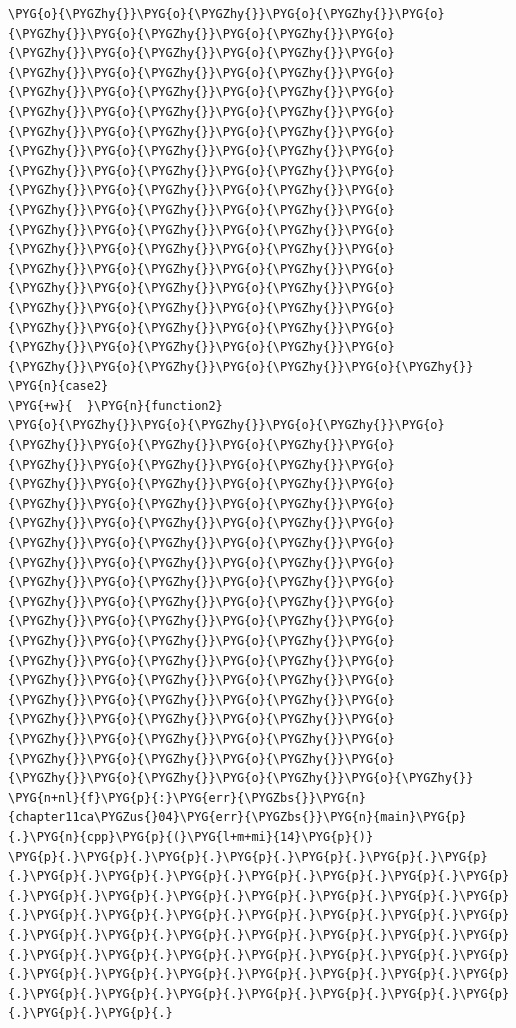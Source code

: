 \begin{codeblockbg}
\begin{Verbatim}[commandchars=\\\{\},breaklines=true,breakanywhere=true,fontsize=\codefont,xleftmargin=17bp]
\PYG{o}{\PYGZhy{}}\PYG{o}{\PYGZhy{}}\PYG{o}{\PYGZhy{}}\PYG{o}{\PYGZhy{}}\PYG{o}{\PYGZhy{}}\PYG{o}{\PYGZhy{}}\PYG{o}{\PYGZhy{}}\PYG{o}{\PYGZhy{}}\PYG{o}{\PYGZhy{}}\PYG{o}{\PYGZhy{}}\PYG{o}{\PYGZhy{}}\PYG{o}{\PYGZhy{}}\PYG{o}{\PYGZhy{}}\PYG{o}{\PYGZhy{}}\PYG{o}{\PYGZhy{}}\PYG{o}{\PYGZhy{}}\PYG{o}{\PYGZhy{}}\PYG{o}{\PYGZhy{}}\PYG{o}{\PYGZhy{}}\PYG{o}{\PYGZhy{}}\PYG{o}{\PYGZhy{}}\PYG{o}{\PYGZhy{}}\PYG{o}{\PYGZhy{}}\PYG{o}{\PYGZhy{}}\PYG{o}{\PYGZhy{}}\PYG{o}{\PYGZhy{}}\PYG{o}{\PYGZhy{}}\PYG{o}{\PYGZhy{}}\PYG{o}{\PYGZhy{}}\PYG{o}{\PYGZhy{}}\PYG{o}{\PYGZhy{}}\PYG{o}{\PYGZhy{}}\PYG{o}{\PYGZhy{}}\PYG{o}{\PYGZhy{}}\PYG{o}{\PYGZhy{}}\PYG{o}{\PYGZhy{}}\PYG{o}{\PYGZhy{}}\PYG{o}{\PYGZhy{}}\PYG{o}{\PYGZhy{}}\PYG{o}{\PYGZhy{}}\PYG{o}{\PYGZhy{}}\PYG{o}{\PYGZhy{}}\PYG{o}{\PYGZhy{}}\PYG{o}{\PYGZhy{}}\PYG{o}{\PYGZhy{}}\PYG{o}{\PYGZhy{}}\PYG{o}{\PYGZhy{}}\PYG{o}{\PYGZhy{}}\PYG{o}{\PYGZhy{}}\PYG{o}{\PYGZhy{}}\PYG{o}{\PYGZhy{}}\PYG{o}{\PYGZhy{}}\PYG{o}{\PYGZhy{}}\PYG{o}{\PYGZhy{}}\PYG{o}{\PYGZhy{}}\PYG{o}{\PYGZhy{}}\PYG{o}{\PYGZhy{}}\PYG{o}{\PYGZhy{}}
\PYG{n}{case2}
\PYG{+w}{  }\PYG{n}{function2}
\PYG{o}{\PYGZhy{}}\PYG{o}{\PYGZhy{}}\PYG{o}{\PYGZhy{}}\PYG{o}{\PYGZhy{}}\PYG{o}{\PYGZhy{}}\PYG{o}{\PYGZhy{}}\PYG{o}{\PYGZhy{}}\PYG{o}{\PYGZhy{}}\PYG{o}{\PYGZhy{}}\PYG{o}{\PYGZhy{}}\PYG{o}{\PYGZhy{}}\PYG{o}{\PYGZhy{}}\PYG{o}{\PYGZhy{}}\PYG{o}{\PYGZhy{}}\PYG{o}{\PYGZhy{}}\PYG{o}{\PYGZhy{}}\PYG{o}{\PYGZhy{}}\PYG{o}{\PYGZhy{}}\PYG{o}{\PYGZhy{}}\PYG{o}{\PYGZhy{}}\PYG{o}{\PYGZhy{}}\PYG{o}{\PYGZhy{}}\PYG{o}{\PYGZhy{}}\PYG{o}{\PYGZhy{}}\PYG{o}{\PYGZhy{}}\PYG{o}{\PYGZhy{}}\PYG{o}{\PYGZhy{}}\PYG{o}{\PYGZhy{}}\PYG{o}{\PYGZhy{}}\PYG{o}{\PYGZhy{}}\PYG{o}{\PYGZhy{}}\PYG{o}{\PYGZhy{}}\PYG{o}{\PYGZhy{}}\PYG{o}{\PYGZhy{}}\PYG{o}{\PYGZhy{}}\PYG{o}{\PYGZhy{}}\PYG{o}{\PYGZhy{}}\PYG{o}{\PYGZhy{}}\PYG{o}{\PYGZhy{}}\PYG{o}{\PYGZhy{}}\PYG{o}{\PYGZhy{}}\PYG{o}{\PYGZhy{}}\PYG{o}{\PYGZhy{}}\PYG{o}{\PYGZhy{}}\PYG{o}{\PYGZhy{}}\PYG{o}{\PYGZhy{}}\PYG{o}{\PYGZhy{}}\PYG{o}{\PYGZhy{}}\PYG{o}{\PYGZhy{}}\PYG{o}{\PYGZhy{}}\PYG{o}{\PYGZhy{}}\PYG{o}{\PYGZhy{}}\PYG{o}{\PYGZhy{}}\PYG{o}{\PYGZhy{}}\PYG{o}{\PYGZhy{}}\PYG{o}{\PYGZhy{}}\PYG{o}{\PYGZhy{}}\PYG{o}{\PYGZhy{}}
\PYG{n+nl}{f}\PYG{p}{:}\PYG{err}{\PYGZbs{}}\PYG{n}{chapter11ca\PYGZus{}04}\PYG{err}{\PYGZbs{}}\PYG{n}{main}\PYG{p}{.}\PYG{n}{cpp}\PYG{p}{(}\PYG{l+m+mi}{14}\PYG{p}{)}
\PYG{p}{.}\PYG{p}{.}\PYG{p}{.}\PYG{p}{.}\PYG{p}{.}\PYG{p}{.}\PYG{p}{.}\PYG{p}{.}\PYG{p}{.}\PYG{p}{.}\PYG{p}{.}\PYG{p}{.}\PYG{p}{.}\PYG{p}{.}\PYG{p}{.}\PYG{p}{.}\PYG{p}{.}\PYG{p}{.}\PYG{p}{.}\PYG{p}{.}\PYG{p}{.}\PYG{p}{.}\PYG{p}{.}\PYG{p}{.}\PYG{p}{.}\PYG{p}{.}\PYG{p}{.}\PYG{p}{.}\PYG{p}{.}\PYG{p}{.}\PYG{p}{.}\PYG{p}{.}\PYG{p}{.}\PYG{p}{.}\PYG{p}{.}\PYG{p}{.}\PYG{p}{.}\PYG{p}{.}\PYG{p}{.}\PYG{p}{.}\PYG{p}{.}\PYG{p}{.}\PYG{p}{.}\PYG{p}{.}\PYG{p}{.}\PYG{p}{.}\PYG{p}{.}\PYG{p}{.}\PYG{p}{.}\PYG{p}{.}\PYG{p}{.}\PYG{p}{.}\PYG{p}{.}\PYG{p}{.}\PYG{p}{.}\PYG{p}{.}\PYG{p}{.}\PYG{p}{.}

\end{Verbatim}
\end{codeblockbg}
